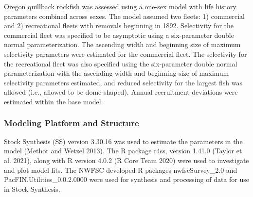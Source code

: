\documentclass[11pt,
  english,
  a4paper,
]{article}
\begin{document}
\leavevmode\tagmcend\tagstructend


Oregon quillback rockfish was assessed using a one-sex model with life history parameters combined across sexes. The model assumed two fleets: 1) commercial and 2) recreational fleets with removals beginning in 1892. Selectivity for the commercial fleet was specified to be asymptotic using a six-parameter double normal parameterization. The ascending width and beginning size of maximum selectivity parameters were estimated for the commercial fleet. The selectivity for the recreational fleet was also specified using the six-parameter double normal parameterization with the ascending width and beginning size of maximum selectivity parameters estimated, and reduced selectivity for the largest fish was allowed (i.e., allowed to be dome-shaped). Annual recruitment deviations were estimated within the base model.

\leavevmode\tagmcend\tagstructend\par


\hypertarget{modeling-platform-and-structure}{%
\subsubsection{Modeling Platform and Structure}\label{modeling-platform-and-structure}}

\leavevmode\tagmcend\tagstructend


Stock Synthesis (SS) version 3.30.16 was used to estimate the parameters in the model {(Methot and Wetzel 2013)\leavevmode\tagmcend\tagstructend}. The R package r4ss, version 1.41.0 {(Taylor et al. 2021)\leavevmode\tagmcend\tagstructend}, along with R version 4.0.2 {(R Core Team 2020)\leavevmode\tagmcend\tagstructend} were used to investigate and plot model fits. The NWFSC developed R packages nwfscSurvey\_2.0 and PacFIN.Utilities\_0.0.2.0000 were used for synthesis and processing of data for use in Stock Synthesis.

\leavevmode\tagmcend\tagstructend\par

\end{document}
